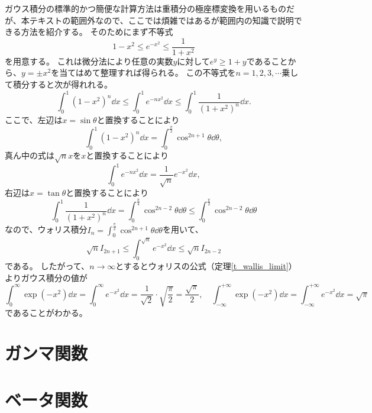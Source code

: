 ガウス積分の標準的かつ簡便な計算方法は重積分の極座標変換を用いるものだが、本テキストの範囲外なので、ここでは煩雑ではあるが範囲内の知識で説明できる方法を紹介する。
そのためにまず不等式
$$
1-x^2 \le e^{-x^2} \le \frac{1}{1+x^2}
$$
を用意する。
これは微分法により任意の実数$y$に対して$e^y \ge 1+y$であることから、$y = \pm x^2$を当てはめて整理すれば得られる。
この不等式を$n = 1, 2, 3, \cdots$乗して積分すると次が得れれる。
$$
\int_0^1 (1-x^2)^n\dd{x} \le \int_0^1 e^{-n x^2}\dd{x} \le \int_0^1 \frac{1}{(1+x^2)^n}\dd{x}.
$$
ここで、左辺は$x = \sin\theta$と置換することにより
$$
\int_0^1 (1-x^2)^n\dd{x} = \int_0^{\frac{\pi}{2}} \cos^{2 n+1}\theta\dd{\theta},
$$
真ん中の式は$\sqrt{n}x$を$x$と置換することにより
$$
\int_0^1 e^{-n x^2}\dd{x} = \frac{1}{\sqrt{n}} e^{-x^2}\dd{x},
$$
右辺は$x = \tan\theta$と置換することにより
$$
\int_0^1 \frac{1}{(1+x^2)^n}\dd{x} = \int_0^{\frac{\pi}{4}} \cos^{2 n-2}\theta\dd{\theta} \le \int_0^{\frac{\pi}{2}} \cos^{2 n-2}\theta\dd{\theta}
$$
なので、ウォリス積分$I_n = \int_0^{\frac{\pi}{2}} \cos^{2 n+1}\theta\dd{\theta}$を用いて、
$$
\sqrt{n}I_{2 n+1} \le \int_0^{\sqrt{n}} e^{-x^2}\dd{x} \le \sqrt{n}I_{2 n-2}
$$
である。
したがって、$n \to \infty$とするとウォリスの公式（定理\ref{t_wallis_limit}）よりガウス積分の値が
$$
\int_0^\infty \exp(-x^2)\dd{x} = \int_0^\infty e^{-x^2}\dd{x} = \frac{1}{\sqrt{2}}\cdot\sqrt{\frac{\pi}{2}} = \frac{\sqrt{\pi}}{2},
\quad \int_{-\infty}^{+\infty} \exp(-x^2)\dd{x} = \int_{-\infty}^{+\infty} e^{-x^2}\dd{x} = \sqrt{\pi}
$$
であることがわかる。

\section{ガンマ関数}

\section{ベータ関数}
